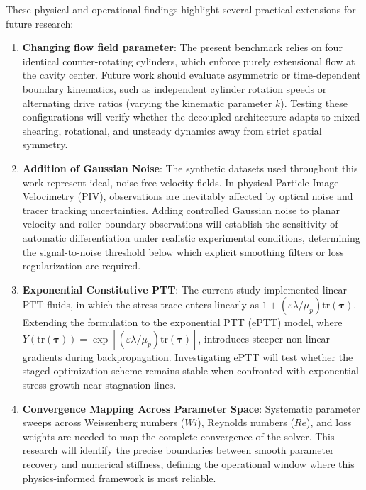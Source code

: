 These physical and operational findings highlight several practical extensions
for future research:
\begin{enumerate}
    \item \textbf{Changing flow field parameter}:
    The present benchmark relies on four identical counter-rotating cylinders,
    which enforce purely extensional flow at the cavity center. Future work
    should evaluate asymmetric or time-dependent boundary kinematics, such as
    independent cylinder rotation speeds or alternating drive ratios (varying
    the kinematic parameter $k$). Testing these configurations will verify
    whether the decoupled architecture adapts to mixed shearing, rotational, and
    unsteady dynamics away from strict spatial symmetry.

    \item \textbf{Addition of Gaussian Noise}:
    The synthetic datasets used throughout this work represent ideal, noise-free
    velocity fields. In physical Particle Image Velocimetry (PIV), observations
    are inevitably affected by optical noise and tracer tracking uncertainties.
    Adding controlled Gaussian noise to planar velocity and roller boundary
    observations will establish the sensitivity of automatic differentiation
    under realistic experimental conditions, determining the signal-to-noise
    threshold below which explicit smoothing filters or loss regularization are
    required.

    \item \textbf{Exponential Constitutive PTT}:
    The current study implemented linear PTT fluids, in which the stress trace
    enters linearly as $1 + (\varepsilon \lambda / \mu_p)\mathrm{tr}(\boldsymbol{\tau})$.
    Extending the formulation to the exponential PTT (ePTT) model, where
    $Y(\mathrm{tr}(\boldsymbol{\tau})) = \exp[(\varepsilon \lambda / \mu_p)\mathrm{tr}(\boldsymbol{\tau})]$,
    introduces steeper non-linear gradients during backpropagation. Investigating
    ePTT will test whether the staged optimization scheme remains stable when
    confronted with exponential stress growth near stagnation lines.

    \item \textbf{Convergence Mapping Across Parameter Space}:
    Systematic parameter sweeps across Weissenberg numbers ($Wi$), Reynolds
    numbers ($Re$), and loss weights are needed to map the complete
    convergence of the solver. This research will identify the precise
    boundaries between smooth parameter recovery and numerical stiffness,
    defining the operational window where this physics-informed framework is
    most reliable.
\end{enumerate}

